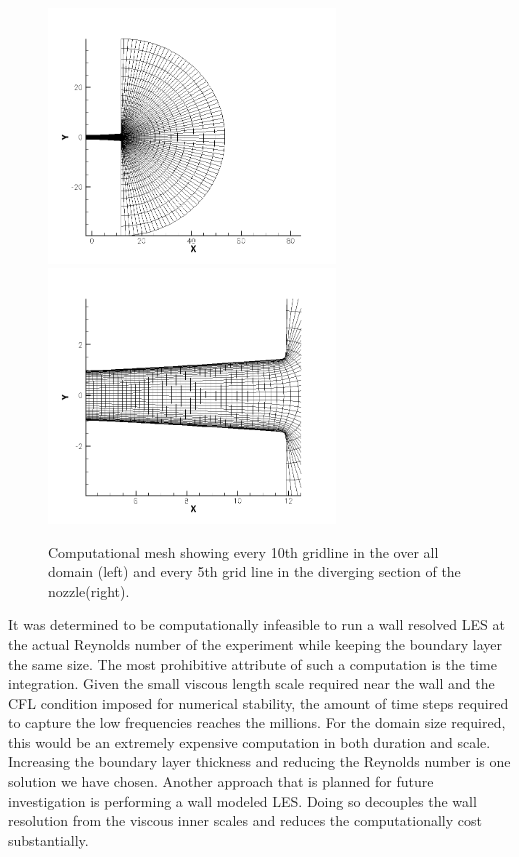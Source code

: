 \documentclass[]{aiaa-tc}%
\begin{document}
\begin{figure}[!htb]%
	\centering
  	\includegraphics[width = 3in]{figs/full5.png}
	\includegraphics[width = 3in]{figs/zoom10.png}
	\caption{Computational mesh showing every 10th gridline in the over all domain (left) and every 5th grid line in the diverging section of the nozzle(right).  }
 	\label{fig:mesh}
\end{figure}

It was determined to be computationally infeasible to run a wall resolved LES at the actual Reynolds number of the experiment while keeping the boundary layer the same size.  The most prohibitive attribute of such a computation is the time integration.  Given the small viscous length scale required near the wall and the CFL condition imposed for numerical stability, the amount of time steps required to capture the low frequencies reaches the millions.  For the domain size required, this would be an extremely expensive computation in both duration and scale.  
Increasing the boundary layer thickness and reducing the Reynolds number is one solution we have chosen.  Another approach that is planned for future investigation is performing a wall modeled LES.  Doing so decouples the wall resolution from the viscous inner scales and reduces the computationally cost substantially.
\end{document}
